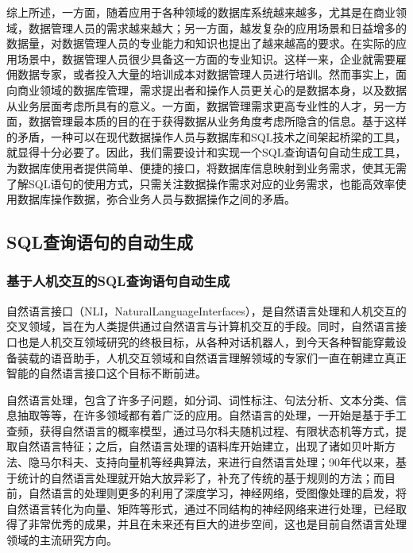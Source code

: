 综上所述，一方面，随着应用于各种领域的数据库系统越来越多，尤其是在商业领域，数据管理人员的需求越来越大；另一方面，越发复杂的应用场景和日益增多的数据量，对数据管理人员的专业能力和知识也提出了越来越高的要求。在实际的应用场景中，数据管理人员很少具备这一方面的专业知识。这样一来，企业就需要雇佣数据专家，或者投入大量的培训成本对数据管理人员进行培训。然而事实上，面向商业领域的数据库管理，需求提出者和操作人员更关心的是数据本身，以及数据从业务层面考虑所具有的意义。一方面，数据管理需求更高专业性的人才，另一方面，数据管理最本质的目的在于获得数据从业务角度考虑所隐含的信息。基于这样的矛盾，一种可以在现代数据操作人员与数据库和SQL技术之间架起桥梁的工具，就显得十分必要了。因此，我们需要设计和实现一个SQL查询语句自动生成工具，为数据库使用者提供简单、便捷的接口，将数据库信息映射到业务需求，使其无需了解SQL语句的使用方式，只需关注数据操作需求对应的业务需求，也能高效率使用数据库操作数据，弥合业务人员与数据操作之间的矛盾。



\subsection{SQL查询语句的自动生成}
\label{intro:sqlag}
\subsubsection{基于人机交互的SQL查询语句自动生成}
自然语言接口（NLI，NaturalLanguageInterfaces），是自然语言处理和人机交互的交叉领域，旨在为人类提供通过自然语言与计算机交互的手段。同时，自然语言接口也是人机交互领域研究的终极目标，从各种对话机器人，到今天各种智能穿戴设备装载的语音助手，人机交互领域和自然语言理解领域的专家们一直在朝建立真正智能的自然语言接口这个目标不断前进。

自然语言处理，包含了许多子问题，如分词、词性标注、句法分析、文本分类、信息抽取等等，在许多领域都有着广泛的应用。自然语言的处理，一开始是基于手工查频，获得自然语言的概率模型，通过马尔科夫随机过程、有限状态机等方式，提取自然语言特征；之后，自然语言处理的语料库开始建立，出现了诸如贝叶斯方法、隐马尔科夫、支持向量机等经典算法，来进行自然语言处理；90年代以来，基于统计的自然语言处理就开始大放异彩了，补充了传统的基于规则的方法；而目前，自然语言的处理则更多的利用了深度学习，神经网络，受图像处理的启发，将自然语言转化为向量、矩阵等形式，通过不同结构的神经网络来进行处理，已经取得了非常优秀的成果，并且在未来还有巨大的进步空间，这也是目前自然语言处理领域的主流研究方向。


